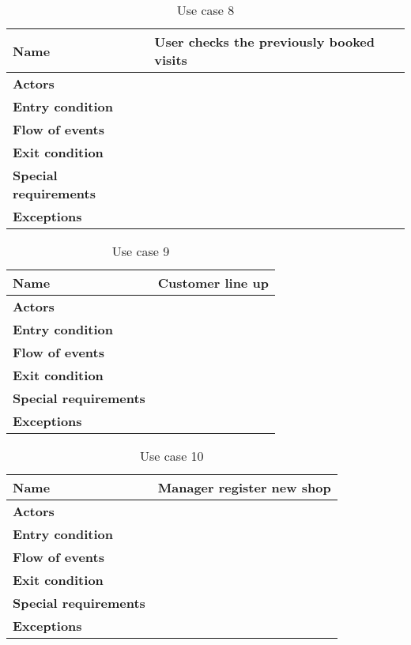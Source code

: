 \begin{table}[h!]
    \centering
    \begin{tabular}{@{}P{0.2\textwidth}P{0.70\textwidth}@{}}
        \toprule
        \textbf{Name}                 & User checks the previously booked visits\\
        \midrule
        \textbf{Actors}               & \\
        \textbf{Entry condition}      & \\
        \textbf{Flow of events}       & \\
        \textbf{Exit condition}       & \\
        \textbf{Special requirements} & \\
        \textbf{Exceptions}           & \\
        \bottomrule
    \end{tabular}
\caption{Use case 8}
\label{table:usecase8}
\end{table}

\begin{table}[h!]
    \centering
    \begin{tabular}{@{}P{0.2\textwidth}P{0.70\textwidth}@{}}
        \toprule
        \textbf{Name}                 & Customer line up\\
        \midrule
        \textbf{Actors}               & \\
        \textbf{Entry condition}      & \\
        \textbf{Flow of events}       & \\
        \textbf{Exit condition}       & \\
        \textbf{Special requirements} & \\
        \textbf{Exceptions}           & \\
        \bottomrule
    \end{tabular}
\caption{Use case 9}
\label{table:usecase9}
\end{table}

\begin{table}[h!]
    \centering
    \begin{tabular}{@{}P{0.2\textwidth}P{0.70\textwidth}@{}}
        \toprule
        \textbf{Name}                 & Manager register new shop\\
        \midrule
        \textbf{Actors}               & \\
        \textbf{Entry condition}      & \\
        \textbf{Flow of events}       & \\
        \textbf{Exit condition}       & \\
        \textbf{Special requirements} & \\
        \textbf{Exceptions}           & \\
        \bottomrule
    \end{tabular}
\caption{Use case 10}
\label{table:usecase10}
\end{table}

